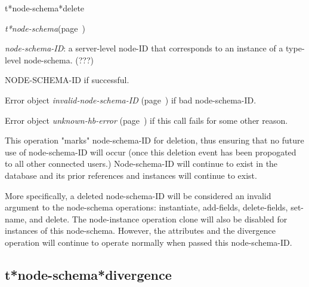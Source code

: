 \begin{description}
\item [Name:]  t*node-schema*delete

\item [Class:] {\sl t*node-schema}\hfill(page~\pageref{t*node-schema})

\item [Parameters:]
\item {\sl node-schema-ID}:  a server-level node-ID that corresponds to an 
instance of a type-level node-schema. (???)



\item [Return-value:]
NODE-SCHEMA-ID if successful. 

Error object {\sl invalid-node-schema-ID} (page~\pageref{invalid-node-schema-ID}) if bad 
node-schema-ID. 

Error object {\sl unknown-hb-error} (page~\pageref{unknown-hb-error}) if this call
fails for some other reason.

\item [Description:]

This operation "marks" node-schema-ID for deletion, 
thus ensuring that no future use of node-schema-ID 
will occur (once this deletion event has been propogated
to all other connected users.)  Node-schema-ID will
continue to exist in the database and its prior 
references and instances will continue to exist. 

More specifically, a deleted node-schema-ID will be
considered an invalid argument to the node-schema
operations: instantiate, add-fields, delete-fields,
set-name, and delete. The node-instance operation clone
will also be disabled for instances of this node-schema.
However, the attributes and the divergence operation will
continue to operate normally when passed this
node-schema-ID.

\item [Public:]



\end{description}
\horizontalline

\subsection{t*node-schema*divergence}
\label{t*node-schema*divergence}

